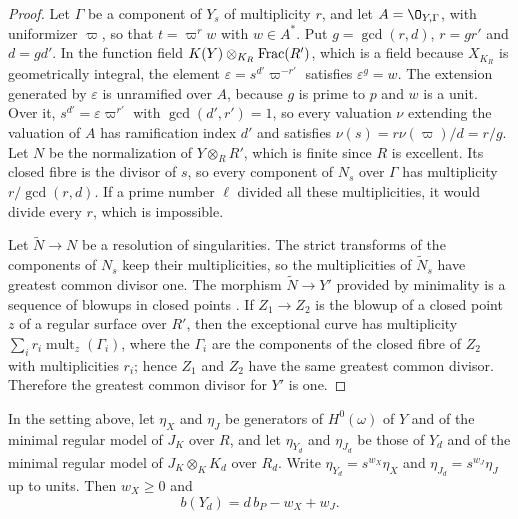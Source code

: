 \begin{proof}
Let $\Gamma$ be a component of $Y_s$ of multiplicity $r$, and let $A = \O_{Y,\Gamma}$, with uniformizer $\varpi$, so that $t = \varpi^rw$ with $w\in A^*$.
Put $g = \gcd(r,d)$, $r = gr'$ and $d = gd'$.
In the function field $K(Y)\otimes_{K_R}\operatorname{Frac}(R')$, which is a field because $X_{K_R}$ is geometrically integral, the element $\varepsilon = s^{d'}\varpi^{-r'}$ satisfies $\varepsilon^g = w$.
The extension generated by $\varepsilon$ is unramified over $A$, because $g$ is prime to $p$ and $w$ is a unit.
Over it, $s^{d'} = \varepsilon\varpi^{r'}$ with $\gcd(d',r') = 1$, so every valuation $\nu$ extending the valuation of $A$ has ramification index $d'$ and satisfies $\nu(s) = r\nu(\varpi)/d = r/g$.
Let $N$ be the normalization of $Y\otimes_RR'$, which is finite since $R$ is excellent.
Its closed fibre is the divisor of $s$, so every component of $N_s$ over $\Gamma$ has multiplicity $r/\gcd(r,d)$.
If a prime number $\ell$ divided all these multiplicities, it would divide every $r$, which is impossible.

Let $\widetilde N\to N$ be a resolution of singularities.
The strict transforms of the components of $N_s$ keep their multiplicities, so the multiplicities of $\widetilde N_s$ have greatest common divisor one.
The morphism $\widetilde N\to Y'$ provided by minimality is a sequence of blowups in closed points \cite[Tag~]{Stacks}.
If $Z_1\to Z_2$ is the blowup of a closed point $z$ of a regular surface over $R'$, then the exceptional curve has multiplicity $\sum_i r_i\operatorname{mult}_z(\Gamma_i)$, where the $\Gamma_i$ are the components of the closed fibre of $Z_2$ with multiplicities $r_i$; hence $Z_1$ and $Z_2$ have the same greatest common divisor.
Therefore the greatest common divisor for $Y'$ is one.
\end{proof}

\begin{lemma}\label{lem:hodge-bound}
In the setting above, let $\eta_X$ and $\eta_J$ be generators of $H^0(\omega)$ of $Y$ and of the minimal regular model of $J_K$ over $R$, and let $\eta_{Y_d}$ and $\eta_{J_d}$ be those of $Y_d$ and of the minimal regular model of $J_K\otimes_KK_d$ over $R_d$.
Write $\eta_{Y_d} = s^{w_X}\eta_X$ and $\eta_{J_d} = s^{w_J}\eta_J$ up to units.
Then $w_X\geq 0$ and
\[
  b(Y_d) = d\,b_P-w_X+w_J.
\]
\end{lemma}

